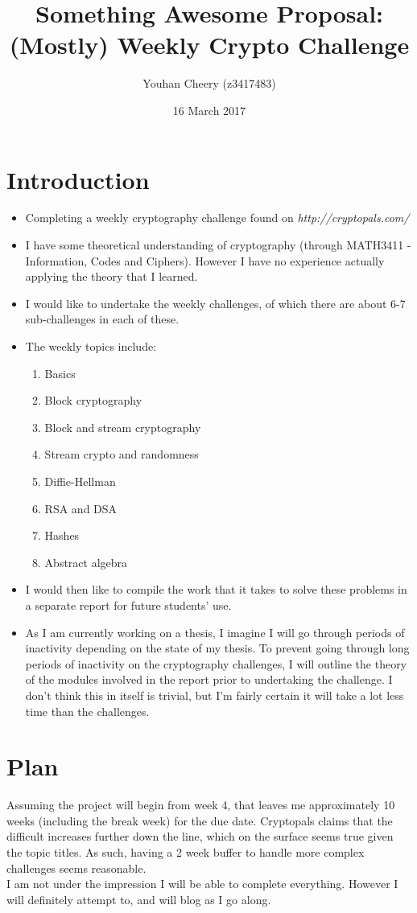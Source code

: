 \documentclass{article}
\title{Something Awesome Proposal:\\(Mostly) Weekly Crypto Challenge}
\author{Youhan Cheery (z3417483)}
\date{16 March 2017}
\begin{document}
\maketitle
\section{Introduction}
\begin{itemize}
    \item Completing a weekly cryptography challenge found on \textit{http://cryptopals.com/}
    \item I have some theoretical understanding of cryptography (through MATH3411 - Information, Codes and Ciphers). However I have no experience actually applying the theory that I learned.
    \item I would like to undertake the weekly challenges, of which there are about 6-7 sub-challenges in each of these.
    \item The weekly topics include:
    \begin{enumerate}
        \item Basics
        \item Block cryptography
        \item Block and stream cryptography
        \item Stream crypto and randomness
        \item Diffie-Hellman
        \item RSA and DSA
        \item Hashes
        \item Abstract algebra
    \end{enumerate}
    \item I would then like to compile the work that it takes to solve these problems in a separate report for future students' use.
    \item As I am currently working on a thesis, I imagine I will go through periods of inactivity depending on the state of my thesis. To prevent going through long periods of inactivity on the cryptography challenges, I will outline the theory of the modules involved in the report prior to undertaking the challenge. I don't think this in itself is trivial, but I'm fairly certain it will take a lot less time than the challenges. 
\end{itemize}
\section{Plan}
Assuming the project will begin from week 4, that leaves me approximately 10 weeks (including the break week) for the due date. Cryptopals claims that the difficult increases further down the line, which on the surface seems true given the topic titles. As such, having a 2 week buffer to handle more complex challenges seems reasonable.\\

I am not under the impression I will be able to complete everything. However I will definitely attempt to, and will blog as I go along. 
\end{document}
